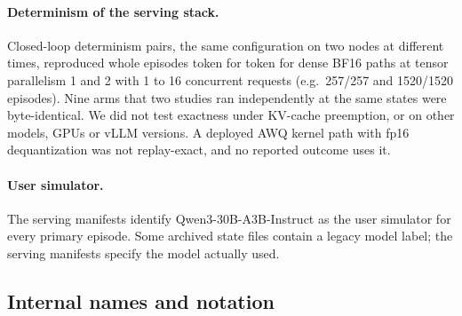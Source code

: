 \paragraph{Determinism of the serving stack.} Closed-loop determinism pairs, the same configuration on two nodes at different times, reproduced whole episodes token for token for dense BF16 paths at tensor parallelism 1 and 2 with 1 to 16 concurrent requests (e.g.\ 257/257 and 1520/1520 episodes). Nine arms that two studies ran independently at the same states were byte-identical. We did not test exactness under KV-cache preemption, or on other models, GPUs or vLLM versions. A deployed AWQ kernel path with fp16 dequantization was not replay-exact, and no reported outcome uses it. %

\paragraph{User simulator.} The serving manifests identify Qwen3-30B-A3B-Instruct as the user simulator for every primary episode. Some archived state files contain a legacy model label; the serving manifests specify the model actually used. %

\subsection{Internal names and notation}
\label{app:names}


